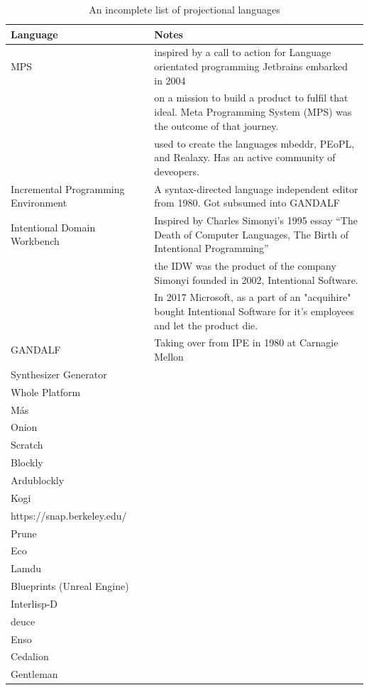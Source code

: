 \begin{table}[h]
    \begin{center}
        \begin{tabular}{ |l | l | } 
            \hline
            Language                   & Notes   \\
            \hline
            MPS & inspired by a call to action for Language orientated programming\cite{dmitriev2004language} Jetbrains embarked in 2004 \\
                & on a mission to build a product to fulfil that ideal.  Meta Programming System (MPS) was the outcome of that journey.  \\
                & used to create the languages mbeddr, PEoPL, and Realaxy.  Has an active community of deveopers. \\
            Incremental Programming Environment\cite{medina1981incremental}  & A syntax-directed language independent editor from 1980. Got subsumed into GANDALF  \\
            Intentional Domain Workbench & Inspired by Charles Simonyi's 1995 essay ``The Death of Computer Languages, The Birth of Intentional Programming''\cite{simonyi1995death}\\
                    & the IDW was the product of the company Simonyi founded in 2002, Intentional Software. \\
                    & In 2017 Microsoft, as a part of an "acquihire" bought Intentional Software for it's employees and let the product die.\\
            GANDALF\cite{NotkinDavid1985TGp} & Taking over from IPE in 1980 at Carnagie Mellon \\
            Synthesizer Generator & \\
            Whole Platform & \\
            M\'as & \\
            Onion & \\
            Scratch & \\
            Blockly & \\
            Ardublockly & \\
            Kogi & \\
            https://snap.berkeley.edu/ & \\
            Prune & \\
            Eco & \\
            Lamdu & \\
            Blueprints (Unreal Engine) & \\
            Interlisp-D & \\
            deuce & \\
            Enso & \\
            Cedalion & \\  
            Gentleman & \\            
            \hline
        \end{tabular}
    \end{center}
    \caption{An incomplete list of projectional languages}
    \label{table:projectional_languages}
\end{table}


